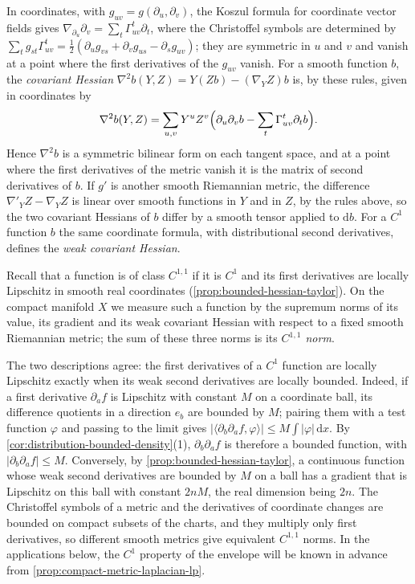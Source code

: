In coordinates, with $g_{uv}=g(\partial_u,\partial_v)$, the Koszul formula for coordinate vector fields gives $\nabla_{\partial_u}\partial_v=\sum_t\Gamma^t_{uv}\partial_t$, where the Christoffel symbols are determined by $\sum_tg_{st}\Gamma^t_{uv}=\frac12(\partial_ug_{vs}+\partial_vg_{us}-\partial_sg_{uv})$; they are symmetric in $u$ and $v$ and vanish at a point where the first derivatives of the $g_{uv}$ vanish. For a smooth function $b$, the \emph{covariant Hessian} $\nabla^2b(Y,Z)=Y(Zb)-(\nabla_YZ)b$ is, by these rules, given in coordinates by
\[
 \nabla^2b(Y,Z)=\sum_{u,v}Y^uZ^v\Bigl(\partial_u\partial_vb-\sum_t\Gamma^t_{uv}\partial_tb\Bigr).
\]
Hence $\nabla^2b$ is a symmetric bilinear form on each tangent space, and at a point where the first derivatives of the metric vanish it is the matrix of second derivatives of $b$. If $g'$ is another smooth Riemannian metric, the difference $\nabla'_YZ-\nabla_YZ$ is linear over smooth functions in $Y$ and in $Z$, by the rules above, so the two covariant Hessians of $b$ differ by a smooth tensor applied to $\mathrm db$. For a $C^1$ function $b$ the same coordinate formula, with distributional second derivatives, defines the \emph{weak covariant Hessian}.

Recall that a function is of class $C^{1,1}$ if it is $C^1$ and its first derivatives are locally Lipschitz in smooth real coordinates (\cref{prop:bounded-hessian-taylor}). On the compact manifold $X$ we measure such a function by the supremum norms of its value, its gradient and its weak covariant Hessian with respect to a fixed smooth Riemannian metric; the sum of these three norms is its \emph{$C^{1,1}$ norm}.

The two descriptions agree: the first derivatives of a $C^1$ function are locally Lipschitz exactly when its weak second derivatives are locally bounded. Indeed, if a first derivative $\partial_af$ is Lipschitz with constant $M$ on a coordinate ball, its difference quotients in a direction $e_b$ are bounded by $M$; pairing them with a test function $\varphi$ and passing to the limit gives $|\langle\partial_b\partial_af,\varphi\rangle|\leq M\int|\varphi|\,\mathrm dx$. By \cref{cor:distribution-bounded-density}(1), $\partial_b\partial_af$ is therefore a bounded function, with $|\partial_b\partial_af|\leq M$. Conversely, by \cref{prop:bounded-hessian-taylor}, a continuous function whose weak second derivatives are bounded by $M$ on a ball has a gradient that is Lipschitz on this ball with constant $2nM$, the real dimension being $2n$. The Christoffel symbols of a metric and the derivatives of coordinate changes are bounded on compact subsets of the charts, and they multiply only first derivatives, so different smooth metrics give equivalent $C^{1,1}$ norms. In the applications below, the $C^1$ property of the envelope will be known in advance from \cref{prop:compact-metric-laplacian-lp}.

